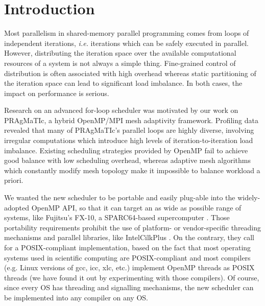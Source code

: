 \documentclass{acm_proc_article-sp}
\newcommand{\ie}{{\em i.e.}\xspace}
\newcommand{\PRAGMATIC}{PRAgMaTIc\xspace}
\begin{document}


\section{Introduction}
\label{sect:intro}
Most parallelism in shared-memory parallel programming comes from loops of
independent iterations, \ie iterations which can be safely executed in parallel.
However, distributing the iteration space over the available computational
resources of a system is not always a simple thing. Fine-grained control of
distribution is often associated with high overhead whereas static partitioning
of the iteration space can lead to significant load imbalance. In both cases,
the impact on performance is serious.

Research on an advanced for-loop scheduler was motivated by our work on 
\PRAGMATIC \cite{DBLP:journals/corr/RokosGSK13}, a hybrid OpenMP/MPI mesh
adaptivity framework. Profiling data revealed that many of \PRAGMATIC's parallel
loops are highly diverse, involving irregular computations which introduce high
levels of iteration-to-iteration load imbalance. Existing scheduling strategies
provided by OpenMP fail to achieve good balance with low scheduling overhead,
whereas adaptive mesh algorithms which constantly modify mesh topology make it
impossible to balance workload a priori.

We wanted the new scheduler to be portable and easily plug-able into the 
widely-adopted OpenMP API, so that it can target an as wide as possible range 
of systems, like Fujitsu's FX-10, a SPARC64-based supercomputer
\cite{fujitsu:fx10}. Those portability requirements prohibit the use of
platform- or vendor-specific threading mechanisms and parallel libraries, like
Intel\textsuperscript \textregistered Cilk\texttrademark Plus
\cite{Robison:2013:CPP:2498335.2498450,Frigo:1998:ICM:277652.277725,
Blumofe95cilk:an}. On the contrary, they call for a POSIX-compliant
implementation, based on the fact that most operating systems used in scientific
computing are POSIX-compliant and most compilers (e.g. Linux versions of gcc,
icc, xlc, etc.) implement OpenMP threads as POSIX threads (we have found it out
by experimenting with those compilers). Of course, since every OS has threading
and signalling mechanisms, the new scheduler can be implemented into any
compiler on any OS.
\end{document}
